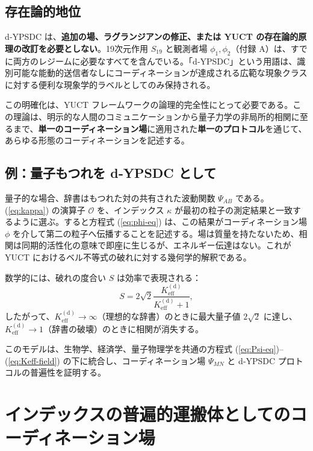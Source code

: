 \documentclass[11pt,a4paper]{article}
\newcommand{\Keff}{K_{\mathrm{eff}}}
\begin{document}
	\subsection{存在論的地位}
	d‑YPSDC は、\textbf{追加の場、ラグランジアンの修正、または YUCT の存在論的原理の改訂を必要としない}。19次元作用 \(S_{19}\) と観測者場 \(\phi_1,\phi_2\)（付録 A）は、すでに両方のレジームに必要なすべてを含んでいる。「d‑YPSDC」という用語は、識別可能な能動的送信者なしにコーディネーションが達成される広範な現象クラスに対する便利な現象学的ラベルとしてのみ保持される。
	
	この明確化は、YUCT フレームワークの論理的完全性にとって必要である。この理論は、明示的な人間のコミュニケーションから量子力学の非局所的相関に至るまで、\textbf{単一のコーディネーション場}に適用された\textbf{単一のプロトコル}を通じて、あらゆる形態のコーディネーションを記述する。
	
	\subsection{例：量子もつれを d‑YPSDC として}
	
	量子的な場合、辞書はもつれた対の共有された波動関数 \(\Psi_{AB}\) である。(\ref{eq:kappa}) の演算子 \(\mathcal{O}\) を、インデックス \(\kappa\) が最初の粒子の測定結果と一致するように選ぶ。すると方程式 (\ref{eq:phi-eq}) は、この結果がコーディネーション場 \(\phi\) を介して第二の粒子へ伝播することを記述する。場は質量を持たないため、相関は同期的活性化の意味で即座に生じるが、エネルギー伝達はない。これが YUCT におけるベル不等式の破れに対する幾何学的解釈である。
	
	数学的には、破れの度合い \(S\) は効率で表現される：
	\begin{equation}
		S = 2\sqrt{2} \frac{\Keff^{\mathrm{(d)}}}{\Keff^{\mathrm{(d)}} + 1},
	\end{equation}
	したがって、\(\Keff^{\mathrm{(d)}} \to \infty\)（理想的な辞書）のときに最大量子値 \(2\sqrt{2}\) に達し、\(\Keff^{\mathrm{(d)}} \to 1\)（辞書の破壊）のときに相関が消失する。
	
	このモデルは、生物学、経済学、量子物理学を共通の方程式 (\ref{eq:Psi-eq})–(\ref{eq:Keff-field}) の下に統合し、コーディネーション場 \(\Psi_{MN}\) と d‑YPSDC プロトコルの普遍性を証明する。
	
	\section{インデックスの普遍的運搬体としてのコーディネーション場}
	
\end{document}
